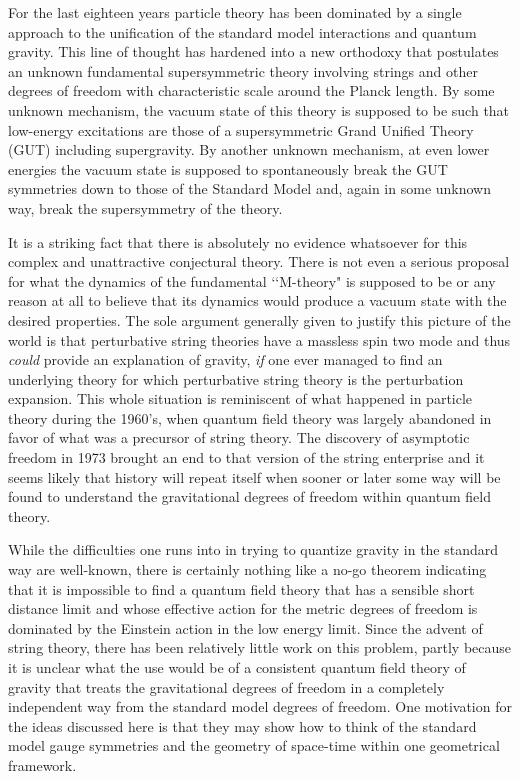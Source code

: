 \documentclass[a4paper,a4paper]{article}
\theoremstyle{conjecture}
\begin{document}
For the last eighteen years particle theory has been dominated by a single approach
to the unification of the standard model interactions and quantum gravity.  This line of thought has
hardened into a new orthodoxy that postulates an unknown fundamental supersymmetric theory involving
strings and other degrees of freedom with characteristic scale around the Planck length. By some
unknown mechanism, the vacuum state of this theory is supposed to be such that low-energy excitations
are those of a supersymmetric Grand Unified Theory (GUT) including supergravity. By another unknown
mechanism, at even lower energies the vacuum state is supposed to spontaneously break the GUT
symmetries down to those of the Standard Model and, again in some unknown way, break the
supersymmetry of the theory.

It is a striking fact that there is absolutely no evidence
whatsoever for this complex and unattractive conjectural theory.
There is not even a serious proposal for what the dynamics of the
fundamental \lq\lq M-theory" is supposed to be or any reason at
all to believe that its dynamics would produce a vacuum state with
the desired properties.  The sole argument generally given to
justify this picture of the world is that perturbative string
theories have a massless spin two mode and thus {\it{could}}
provide an explanation of gravity, {\it{if}} one ever managed to
find an underlying theory for which perturbative string theory is
the perturbation expansion.  This whole situation is  reminiscent
of what happened in particle theory during the 1960's, when
quantum field theory was largely abandoned in favor of what was a
precursor of string theory.  The discovery of asymptotic freedom
in 1973 brought an end to that version of the string enterprise
and it seems likely that history will repeat itself when sooner or
later some way will be found to understand the gravitational
degrees of freedom within quantum field theory.

While the difficulties one runs into in trying to quantize gravity in the standard way are
well-known, there is certainly nothing like a no-go theorem indicating that it is impossible to find
a quantum field theory that has a sensible short distance limit and whose effective action for the
metric degrees of freedom is dominated by the Einstein action in the low energy limit.  Since the
advent of string theory, there has been relatively little work on this problem, partly because it is
unclear what the use would be of a consistent quantum field theory of gravity that treats the
gravitational degrees of freedom in a completely independent way from the standard model degrees of
freedom. One motivation for the ideas discussed here is that they may show how to think of the
standard model gauge symmetries and the geometry of space-time within one geometrical framework.
\end{document}
